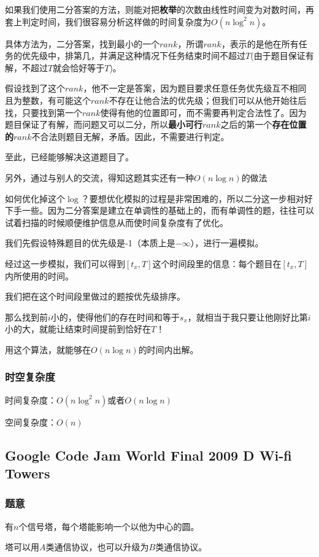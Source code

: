 \documentclass{ctexart}
\begin{document}
如果我们使用二分答案的方法，则能对把{\textbf{枚举}}的次数由线性时间变为对数时间，再套上判定时间，我们很容易分析这样做的时间复杂度为$O(n \log^2 n)$。

具体方法为，二分答案，找到最小的一个$rank$，所谓$rank$，表示的是他在所有任务的优先级中，排第几，并满足这种情况下任务结束时间不超过$T$(由于题目保证有解，不超过$T$就会恰好等于$T$)。

假设找到了这个$rank$，他不一定是答案，因为题目要求任意任务优先级互不相同且为整数，有可能这个$rank$不存在让他合法的优先级；但我们可以从他开始往后找，只要找到第一个$rank$使得有他的位置即可，而不需要再判定合法性了。因为题目保证了有解，而问题又可以二分，所以{\textbf{最小可行$rank$}}之后的第一个{\textbf{存在位置的$rank$}}不合法则题目无解，矛盾。因此，不需要进行判定。

至此，已经能够解决这道题目了。

另外，通过与别人的交流，得知这题其实还有一种$O(n \log n)$的做法

如何优化掉这个$\log$？要想优化模拟的过程是非常困难的，所以二分这一步相对好下手一些。因为二分答案是建立在单调性的基础上的，而有单调性的题，往往可以试着扫描的时候顺便维护信息从而使时间复杂度有了优化。

我们先假设特殊题目的优先级是-1（本质上是$-\infty$），进行一遍模拟。

经过这一步模拟，我们可以得到$[t_x,T]$这个时间段里的信息：每个题目在$[t_x,T]$内所使用的时间。

我们把在这个时间段里做过的题按优先级排序。

那么找到前$i$小的，使得他们的存在时间和等于$s_x$，就相当于我只要让他刚好比第$i$小的大，就能让结束时间提前到恰好在$T$！

用这个算法，就能够在$O(n \log n)$的时间内出解。
\subsubsection{时空复杂度}
时间复杂度：$O(n \log^2 n)$或者$O(n \log n)$

空间复杂度：$O(n)$
\subsection{Google Code Jam World Final 2009 D Wi-fi Towers}
\subsubsection{题意}
有$n$个信号塔，每个塔能影响一个以他为中心的圆。

塔可以用$A$类通信协议，也可以升级为$B$类通信协议。
\end{document}
